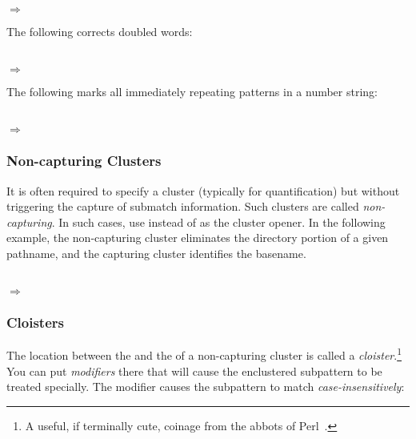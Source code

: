 $\Rightarrow$ 

The following corrects doubled words:

 \\
$\Rightarrow$ 

The following marks all immediately repeating patterns in a number
string:

\\ $\Rightarrow$ 

\subsubsection {Non-capturing Clusters}

It is often required to specify a cluster (typically for
quantification) but without triggering the capture of submatch
information.  Such clusters are called \emph{non-capturing}.  In such
cases, use  instead of \code{(} as the cluster opener.  In
the following example, the non-capturing cluster eliminates the
directory portion of a given pathname, and the capturing cluster
identifies the basename.

 \\
$\Rightarrow$ 

\subsubsection {Cloisters}

The location between the  and the \code{:} of a non-capturing
cluster is called a \emph{cloister}.\footnote{A useful, if terminally
  cute, coinage from the abbots of Perl~\cite{pperl}.}  You can put
\emph{modifiers} there that will cause the enclustered subpattern to
be treated specially.  The modifier  causes the subpattern to
match \emph{case-insensitively}:

